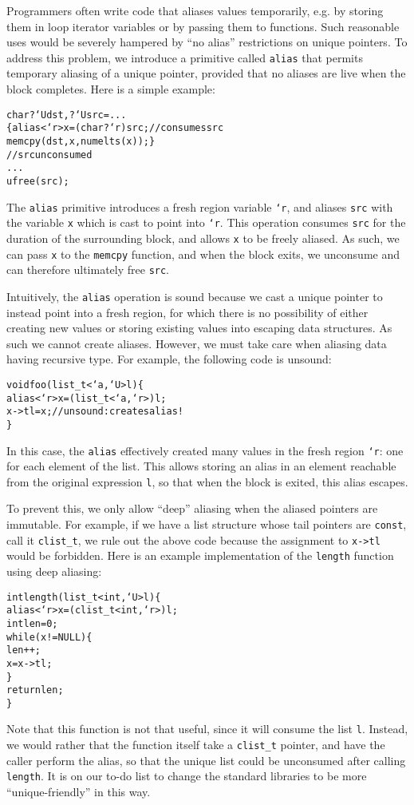 Programmers often write code that aliases values temporarily, e.g. by
storing them in loop iterator variables or by passing them to functions.
Such reasonable uses would be severely hampered by ``no alias'' restrictions
on unique pointers.  To address this problem, we introduce a primitive
called \texttt{alias} that permits temporary aliasing of a unique pointer,
provided that no aliases are live when the block completes.
Here is a simple example:
\begin{alltt}
  char ?`U dst, ?`U src = ...
  \{ alias <`r> x = (char ?`r)src; // consumes src
    memcpy(dst,x,numelts(x)); \}
  // src unconsumed
  ...
  ufree(src);
\end{alltt}
The \texttt{alias} primitive introduces a fresh region variable \texttt{`r},
and aliases \texttt{src} with the variable \texttt{x} which is cast to point
into \texttt{`r}.  This operation consumes \texttt{src} for the duration of
the surrounding block, and allows \texttt{x} to be freely aliased.  As such,
we can pass \texttt{x} to the \texttt{memcpy} function, and when the block
exits, we unconsume and can therefore ultimately free \texttt{src}.

Intuitively, the \texttt{alias} operation is sound because we cast a unique
pointer to instead point into a fresh region, for which there is no
possibility of either creating new values or storing existing values into
escaping data structures.  As such we cannot create aliases.  However, we
must take care when aliasing data having recursive type.  For example, the
following code is unsound:
\begin{alltt}
  void foo(list\_t<`a,`U> l) \{
    alias <`r> x = (list\_t<`a,`r>)l;
    x->tl = x; // unsound: creates alias!
  \}
\end{alltt}
In this case, the \texttt{alias} effectively created many values in the
fresh region \texttt{`r}: one for each element of the list.  This allows
storing an alias in an element reachable from the original expression
\texttt{l}, so that when the block is exited, this alias escapes.

To prevent this, we only allow ``deep'' aliasing when the aliased pointers
are immutable.  For example, if we have a list structure whose tail pointers
are \texttt{const}, call it \texttt{clist\_t}, we rule out the above code
because the assignment to \texttt{x->tl} would be forbidden.  Here is an
example implementation of the \texttt{length} function using deep aliasing:
\begin{alltt}
  int length(list\_t<int,`U> l) \{
    alias <`r> x = (clist\_t<int,`r>)l;
    int len = 0;
    while (x != NULL) \{
      len++;
      x = x->tl;
    \}
    return len;
  \}
\end{alltt}
Note that this function is not that useful, since it will consume the list
\texttt{l}.  Instead, we would rather that the function itself take a
\texttt{clist\_t} pointer, and have the caller perform the alias, so that
the unique list could be unconsumed after calling \texttt{length}.  It is on
our to-do list to change the standard libraries to be more
``unique-friendly'' in this way.


